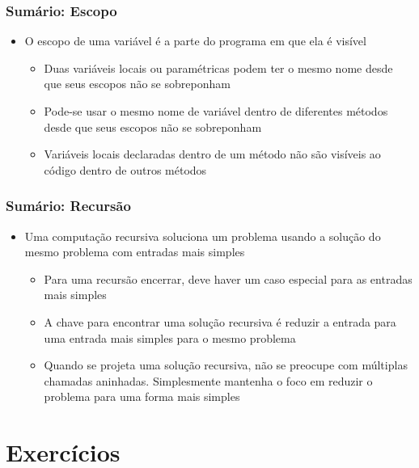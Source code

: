 \documentclass[xcolor={dvipsnames,table},aspectratio=169]{beamer}
\begin{document}
\begin{frame}\frametitle{Sumário: Escopo}
\begin{itemize}
	\item O escopo de uma variável é a parte do programa em que ela é visível
	\begin{itemize}
		\item Duas variáveis locais ou paramétricas podem ter o mesmo nome desde que seus escopos não se sobreponham
		\item Pode-se usar o mesmo nome de variável dentro de diferentes métodos desde que seus escopos não se sobreponham
		\item Variáveis locais declaradas dentro de um método não são visíveis ao código dentro de outros métodos
	\end{itemize}
\end{itemize}
\end{frame}

\begin{frame}\frametitle{Sumário: Recursão}
\begin{itemize}
	\item Uma computação recursiva soluciona um problema usando a solução do mesmo problema com entradas mais simples
	\begin{itemize}
		\item Para uma recursão encerrar, deve haver um caso especial para as entradas mais simples
		\item A chave para encontrar uma solução recursiva é reduzir a entrada para uma entrada mais simples para o mesmo problema
		\item Quando se projeta uma solução recursiva, não se preocupe com múltiplas chamadas aninhadas. Simplesmente mantenha o foco em reduzir o problema para uma forma mais simples
	\end{itemize}
\end{itemize}
\end{frame}

\section{Exercícios}
\end{document}
